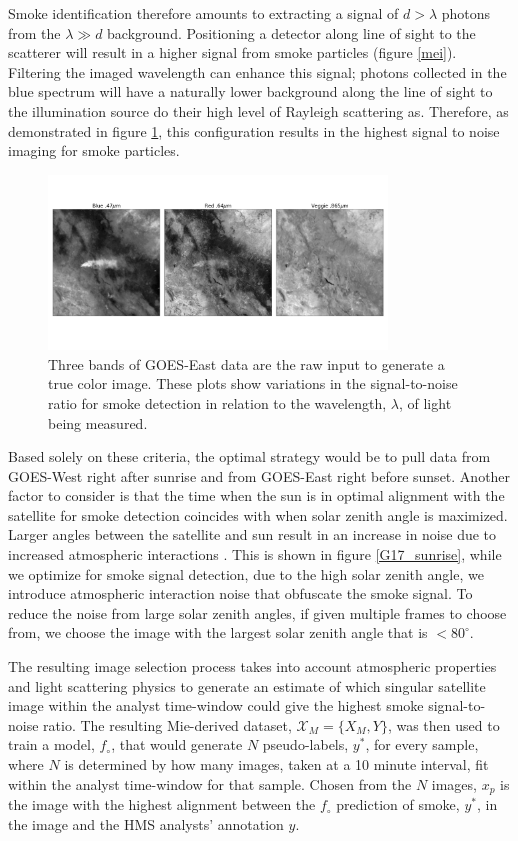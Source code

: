 \documentclass{article}
\begin{document}
Smoke identification therefore amounts to extracting a signal of \(d > \lambda\) photons from the \(\lambda \gg d\) background. Positioning a detector along line of sight to the scatterer will result in a higher signal from smoke particles (figure \ref{mei}). Filtering the imaged wavelength can enhance this signal; photons collected in the blue spectrum will have a naturally lower background along the line of sight to the illumination source do their high level of Rayleigh scattering as. Therefore, as demonstrated in figure \ref{bands}, this configuration results in the highest signal to noise imaging for smoke particles.

\begin{figure}
    \centering
    \includegraphics[width=9cm]{figures/GOES16_bands.png}
    \caption{Three bands of GOES-East data are the raw input to generate a true color image. These plots show variations in the signal-to-noise ratio for smoke detection in relation to the wavelength, \(\lambda\), of light being measured.}\label{bands}
\end{figure}

Based solely on these criteria, the optimal strategy would be to pull data from GOES-West right after sunrise and from GOES-East right before sunset. Another factor to consider is that the time when the sun is in optimal alignment with the satellite for smoke detection coincides with when solar zenith angle is maximized. Larger angles between the satellite and sun result in an increase in noise due to increased atmospheric interactions \cite{zen_angle}. This is shown in figure \ref{G17_sunrise}, while we optimize for smoke signal detection, due to the high solar zenith angle, we introduce atmospheric interaction noise that obfuscate the smoke signal. To reduce the noise from large solar zenith angles, if given multiple frames to choose from, we choose the image with the largest solar zenith angle that is \(<80^{\circ}\).



The resulting image selection process takes into account atmospheric properties and light scattering physics to generate an estimate of which singular satellite image within the analyst time-window could give the highest smoke signal-to-noise ratio. The resulting Mie-derived dataset, \(\mathcal{X}_M = \{X_M, Y\}\), was then used to train a model, \(f_{\circ}\), that would generate \(N\) pseudo-labels, \(y^*\), for every sample, where \(N\) is determined by how many images, taken at a 10 minute interval, fit within the analyst time-window for that sample. Chosen from the \(N\) images, \(x_p\) is the image with the highest alignment between the \(f_{\circ}\) prediction of smoke, \(y^*\), in the image and the HMS analysts' annotation \(y\).
\end{document}
